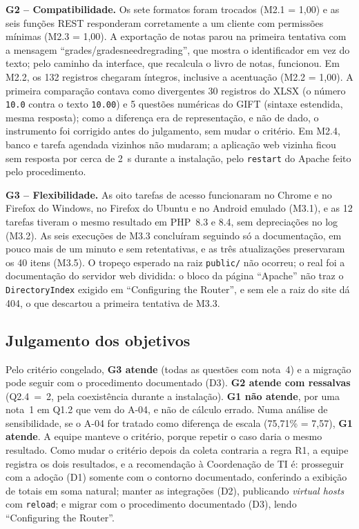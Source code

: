 \documentclass[12pt]{article}
\begin{document}
\textbf{G2 -- Compatibilidade.} Os sete formatos foram trocados (M2.1 = 1,00) e as seis funções REST responderam corretamente a um cliente com permissões mínimas (M2.3 = 1,00). A exportação de notas parou na primeira tentativa com a mensagem ``grades/gradesneedregrading'', que mostra o identificador em vez do texto; pelo caminho da interface, que recalcula o livro de notas, funcionou. Em M2.2, os 132 registros chegaram íntegros, inclusive a acentuação (M2.2 = 1,00). A primeira comparação contava como divergentes 30 registros do XLSX (o número \texttt{10.0} contra o texto \texttt{10.00}) e 5 questões numéricas do GIFT (sintaxe estendida, mesma resposta); como a diferença era de representação, e não de dado, o instrumento foi corrigido antes do julgamento, sem mudar o critério. Em M2.4, banco e tarefa agendada vizinhos não mudaram; a aplicação web vizinha ficou sem resposta por cerca de 2~s durante a instalação, pelo \texttt{restart} do Apache feito pelo procedimento.

\textbf{G3 -- Flexibilidade.} As oito tarefas de acesso funcionaram no Chrome e no Firefox do Windows, no Firefox do Ubuntu e no Android emulado (M3.1), e as 12 tarefas tiveram o mesmo resultado em PHP~8.3 e 8.4, sem depreciações no log (M3.2). As seis execuções de M3.3 concluíram seguindo só a documentação, em pouco mais de um minuto e sem retentativas, e as três atualizações preservaram os 40 itens (M3.5). O tropeço esperado na raiz \texttt{public/} não ocorreu; o real foi a documentação do servidor web dividida: o bloco da página ``Apache'' não traz o \texttt{DirectoryIndex} exigido em ``Configuring the Router'', e sem ele a raiz do site dá 404, o que descartou a primeira tentativa de M3.3.

\subsection{Julgamento dos objetivos}

Pelo critério congelado, \textbf{G3 atende} (todas as questões com nota~4) e a migração pode seguir com o procedimento documentado (D3). \textbf{G2 atende com ressalvas} (Q2.4~=~2, pela coexistência durante a instalação). \textbf{G1 não atende}, por uma nota~1 em Q1.2 que vem do A-04, e não de cálculo errado. Numa análise de sensibilidade, se o A-04 for tratado como diferença de escala (75,71\% = 7,57), \textbf{G1 atende}. A equipe manteve o critério, porque repetir o caso daria o mesmo resultado. Como mudar o critério depois da coleta contraria a regra R1, a equipe registra os dois resultados, e a recomendação à Coordenação de TI é: prosseguir com a adoção (D1) somente com o contorno documentado, conferindo a exibição de totais em soma natural; manter as integrações (D2), publicando \emph{virtual hosts} com \texttt{reload}; e migrar com o procedimento documentado (D3), lendo ``Configuring the Router''.
\end{document}
